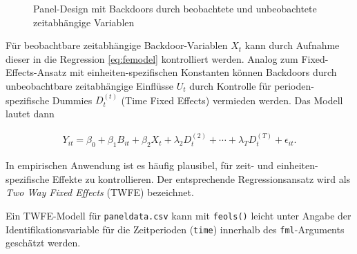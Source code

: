 \documentclass[
  a4paper,
  DIV=11,
  oneside]{scrreprt}
\begin{document}
\begin{figure}[t]


\caption{\label{fig-FEDAG3}Panel-Design mit Backdoors durch beobachtete
und unbeobachtete zeitabhängige Variablen}

\end{figure}%

Für beobachtbare zeitabhängige Backdoor-Variablen \(X_t\) kann durch
Aufnahme dieser in die Regression \eqref{eq:femodel} kontrolliert
werden. Analog zum Fixed-Effects-Ansatz mit einheiten-spezifischen
Konstanten können Backdoors durch unbeobachtbare zeitabhängige Einflüsse
\(U_t\) durch Kontrolle für perioden-spezifische Dummies \(D_t^{(t)}\)
(Time Fixed Effects) vermieden werden. Das Modell lautet dann

\begin{align*}
  Y_{it} = \beta_0 + \beta_1 B_{it} + \beta_2 X_t + \lambda_2 D_t^{(2)} + \cdots + \lambda_T D_t^{(T)} + \epsilon_{it}. 
\end{align*}

In empirischen Anwendung ist es häufig plausibel, für zeit- und
einheiten-spezifische Effekte zu kontrollieren. Der entsprechende
Regressionsansatz wird als \emph{Two Way Fixed Effects} (TWFE)
bezeichnet.

Ein TWFE-Modell für \texttt{paneldata.csv} kann mit \texttt{feols()}
leicht unter Angabe der Identifikationsvariable für die Zeitperioden
(\texttt{time}) innerhalb des \texttt{fml}-Arguments geschätzt werden.
\end{document}
